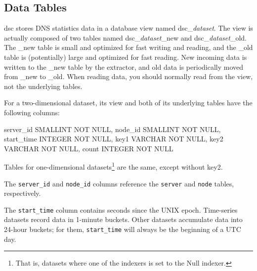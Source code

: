 \documentclass{report}
\def\dsc{{\sc dsc}}
\begin{document}
\subsection{Data Tables}

{\dsc} stores DNS statistics data in a database view named dsc\_{\em dataset\/}.
The view is actually composed of two tables named
dsc\_{\em dataset\/}\_new and dsc\_{\em dataset\/}\_old.
The \_new table is small and optimized for fast writing and reading,
and the \_old table is (potentially) large and optimized for fast reading.
New incoming data is written to the \_new table by the extractor,
and old data is periodically moved from \_new to \_old.
When reading data, you should normally read from the view, not the
underlying tables.

For a two-dimensional dataset, its view and both of its underlying tables
have the following columns:

\begin{MyVerbatim}
    server_id     SMALLINT NOT NULL,
    node_id       SMALLINT NOT NULL,
    start_time    INTEGER NOT NULL,
    key1          VARCHAR NOT NULL,
    key2          VARCHAR NOT NULL,
    count         INTEGER NOT NULL
\end{MyVerbatim}

\noindent
Tables for one-dimensional datasets\footnote{That is, datasets where one of
the indexers is set to the Null indexer.} are the same, except without key2.

The {\tt server\_id} and {\tt node\_id} columns reference the {\tt server}
and {\tt node} tables, respectively.

The {\tt start\_time} column contains seconds since the UNIX epoch.
Time-series datasets record data in 1-minute buckets.  Other datasets
accumulate data into 24-hour buckets; for them, {\tt start\_time} will always
be the beginning of a UTC day.

%
\end{document}
